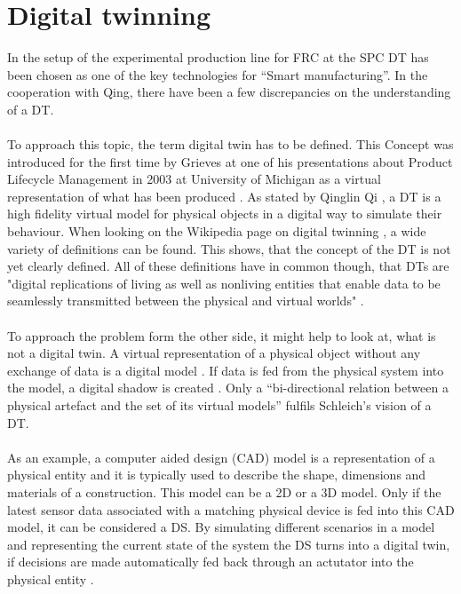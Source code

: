 \bigskip


\section{Digital twinning}

In the setup of the experimental production line for \ac{FRC} at the \ac{SPC} 
\ac{DT} has been chosen as one of the key technologies for “Smart manufacturing”. In the cooperation with Qing, there have been a few discrepancies on the understanding of a \ac{DT}.\\
\\
To approach this topic, the term digital twin has to be defined.
This Concept was introduced for the first time by Grieves at one of his presentations about Product Lifecycle Management in 2003 at University of Michigan as a virtual representation of what has been produced \cite{GreivesDTfirst}.
As stated by Qinglin Qi \cite{Qi2018DigitalTS}, a \ac{DT} is a high fidelity virtual model for physical objects in a digital way to simulate their behaviour. 
When looking on the Wikipedia page on digital twinning \cite{DTwikip}, a wide variety of definitions can be found. 
This shows, that the concept of the \ac{DT} is not yet clearly defined. All of these definitions have in common though, that \acp{DT} are "digital replications of living as well as nonliving entities that 
enable data to be seamlessly transmitted between the physical and virtual worlds" \cite{SaddikDTmultimconv}.\\
\\
To approach the problem form the other side, it might help to look at, what is not a digital twin.
A virtual representation of a physical object without any exchange of data is a digital model \cite{WongWhatisDT}. 
If data is fed from the physical system into the model, a digital shadow is created \cite{KRITZINGER20181016}.
Only a “bi-directional relation between a physical artefact and the set of its virtual models” \cite{SchleichDTshaping} fulfils Schleich's vision of a \ac{DT}.\\
\\
As an example, a computer aided design (CAD) model is a representation of a physical entity and it is typically used to describe the shape, dimensions and materials of a construction. This model can be a 2D or a 3D model. Only if the latest sensor data associated with a matching physical device is fed into this CAD model, it can be considered a DS. \cite{WongWhatisDT} By simulating different scenarios in a model and representing the current state of the system the DS turns into a digital twin, if decisions are made automatically fed back through an actutator into the physical entity \cite{SchleichDTshaping}.
